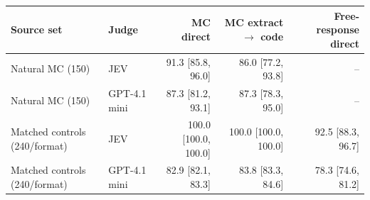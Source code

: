 \begin{tabular}{@{}llrrr@{}}
\toprule
Source set & Judge & MC direct & MC extract $\rightarrow$ code & Free-response direct \\
\midrule
Natural MC (150) & JEV & 91.3 [85.8, 96.0] & 86.0 [77.2, 93.8] & -- \\
Natural MC (150) & GPT-4.1 mini & 87.3 [81.2, 93.1] & 87.3 [78.3, 95.0] & -- \\
Matched controls (240/format) & JEV & 100.0 [100.0, 100.0] & 100.0 [100.0, 100.0] & 92.5 [88.3, 96.7] \\
Matched controls (240/format) & GPT-4.1 mini & 82.9 [82.1, 83.3] & 83.8 [83.3, 84.6] & 78.3 [74.6, 81.2] \\
\bottomrule
\end{tabular}
